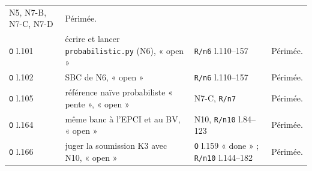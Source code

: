 {\begin{longtable}{@{}>{\raggedright\arraybackslash}p{2.6cm}>{\raggedright\arraybackslash}p{3.6cm}>{\raggedright\arraybackslash}p{3.6cm}>{\raggedright\arraybackslash}p{5.2cm}@{}}
N5, N7-B, N7-C, N7-D & Périmée. \\
\texttt{O} l.101 & écrire et lancer \texttt{probabilistic.py} (N6), « open » &
\texttt{R/n6} l.110--157 & Périmée. \\
\texttt{O} l.102 & SBC de N6, « open » & \texttt{R/n6} l.110--157 & Périmée. \\
\texttt{O} l.105 & référence naïve probabiliste « pente », « open » & N7-C, \texttt{R/n7} &
Périmée. \\
\texttt{O} l.164 & même banc à l'EPCI et au BV, « open » & N10, \texttt{R/n10} l.84--123 &
Périmée. \\
\texttt{O} l.166 & juger la soumission K3 avec N10, « open » &
\texttt{O} l.159 « done » ; \texttt{R/n10} l.144--182 & Périmée. \\
\end{longtable}
}
\endgroup
